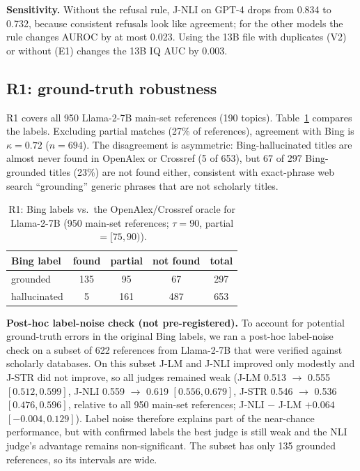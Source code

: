 \documentclass[acmsmall,screen]{acmart}
\begin{document}
\textbf{Sensitivity.} Without the refusal rule, J-NLI on GPT-4 drops from 0.834 to 0.732, because consistent refusals look like agreement; for the other models the rule changes AUROC by at most 0.023. Using the 13B file with duplicates (V2) or without (E1) changes the 13B IQ AUC by 0.003.

\subsection{R1: ground-truth robustness}\label{sec:r1}
R1 covers all 950 Llama-2-7B main-set references (190 topics). Table~\ref{tab:r1} compares the labels. Excluding partial matches (27\% of references), agreement with Bing is $\kappa=0.72$ ($n=694$). The disagreement is asymmetric: Bing-hallucinated titles are almost never found in OpenAlex or Crossref (5 of 653), but 67 of 297 Bing-grounded titles (23\%) are not found either, consistent with exact-phrase web search ``grounding'' generic phrases that are not scholarly titles.

\begin{table}[t]
\caption{R1: Bing labels vs.\ the OpenAlex/Crossref oracle for Llama-2-7B (950 main-set references; $\tau=90$, partial $=[75,90)$).}
\label{tab:r1}
\small
\begin{tabular}{lcccc}
\toprule
Bing label & found & partial & not found & total \\
\midrule
grounded & 135 & 95 & 67 & 297 \\
hallucinated & 5 & 161 & 487 & 653 \\
\bottomrule
\end{tabular}
\end{table}

\textbf{Post-hoc label-noise check (not pre-registered).} To account for potential ground-truth errors in the original Bing labels, we ran a post-hoc label-noise check on a subset of 622 references from Llama-2-7B that were verified against scholarly databases. On this subset J-LM and J-NLI improved only modestly and J-STR did not improve, so all judges remained weak (J-LM 0.513 $\to$ 0.555 $[0.512, 0.599]$, J-NLI 0.559 $\to$ 0.619 $[0.556, 0.679]$, J-STR 0.546 $\to$ 0.536 $[0.476, 0.596]$, relative to all 950 main-set references; J-NLI $-$ J-LM $+0.064$ $[-0.004, 0.129]$). Label noise therefore explains part of the near-chance performance, but with confirmed labels the best judge is still weak and the NLI judge's advantage remains non-significant. The subset has only 135 grounded references, so its intervals are wide.
\end{document}
